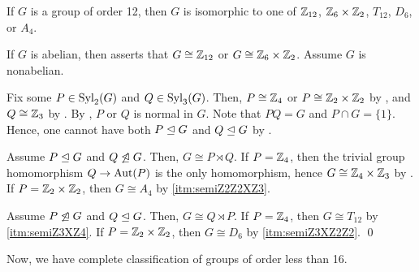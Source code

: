 \documentclass[../modern_algebra.tex]{subfiles}
\begin{document}
\begin{Theorem}{\textsf{}}{}
    If \(G\) is a group of order 12,
    then \(G\) is isomorphic to one of
    \(\ZZ_{12}\), \(\ZZ_6 \times \ZZ_2\), \(T_{12}\), \(D_6\), or \(A_4\).
\end{Theorem}
\begin{myclaim}[Proof]
    If \(G\) is abelian, then  asserts that
    \(G \cong \ZZ_{12}\) or \(G \cong \ZZ_6 \times \ZZ_2\).
    Assume \(G\) is nonabelian.

    Fix some \(P \in \operatorname{Syl}_2(G)\) and \(Q \in \operatorname{Syl}_3(G)\).
    Then, \(P \cong \ZZ_4\) or \(P \cong \ZZ_2 \times \ZZ_2\) by ,
    and \(Q \cong \ZZ_3\) by .
    By , \(P\) or \(Q\) is normal in \(G\).
    Note that \(PQ = G\) and \(P \cap G = \{1\}\). Hence,
    one cannot have both \(P \trianglelefteq G\) and \(Q \trianglelefteq G\) by .
    \begin{itemize}[nolistsep, leftmargin=*, listparindent=\parindent]
        \ii
        Assume \(P \trianglelefteq G\) and \(Q \not\trianglelefteq G\).
        Then, \(G \cong P \rtimes Q\).
        If \(P = \ZZ_4\), then the trivial group homomorphism \(Q \to \operatorname{Aut}(P)\)
        is the only homomorphism, hence \(G \cong \ZZ_4 \times \ZZ_3\) by .
        If \(P = \ZZ_2 \times \ZZ_2\), then \(G \cong A_4\) by \ref{itm:semiZ2Z2XZ3}.

        \ii
        Assume \(P \not\trianglelefteq G\) and \(Q \trianglelefteq G\). Then, \(G \cong Q \rtimes P\).
        If \(P = \ZZ_4\), then \(G \cong T_{12}\) by \ref{itm:semiZ3XZ4}.
        If \(P = \ZZ_2 \times \ZZ_2\), then \(G \cong D_6\) by \ref{itm:semiZ3XZ2Z2}.
        \qed
    \end{itemize}
\end{myclaim}

\begin{note}
    Now, we have complete classification of groups of order less than 16.
\end{note}
\end{document}
